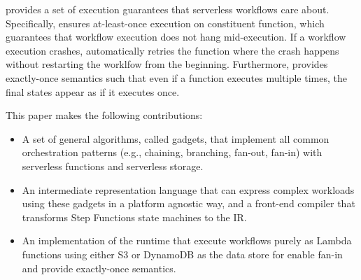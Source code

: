 \name{} provides a set of execution guarantees that serverless workflows care
about. Specifically, \name{} ensures at-least-once execution on constituent
function, which guarantees that workflow execution does not hang
mid-execution. If a workflow execution crashes, \name{} automatically retries
the function where the crash happens without restarting the worklfow from the
beginning. Furthermore, \name{} provides exactly-once semantics such that even
if a function executes multiple times, the final states appear as if it
executes once.


This paper makes the following contributions:

\begin{itemize}

  \item A set of general algorithms, called gadgets, that implement all common
  orchestration patterns (e.g., chaining, branching, fan-out, fan-in) with
  serverless functions and serverless storage.

  \item An intermediate representation language that can express complex
  workloads using these gadgets in a platform agnostic way, and a front-end
  compiler that transforms Step Functions state machines to the IR.

  \item An implementation of the \name{} runtime that execute workflows purely
  as Lambda functions using either S3 or DynamoDB as the data store for enable
  fan-in and provide exactly-once semantics.

\end{itemize}

